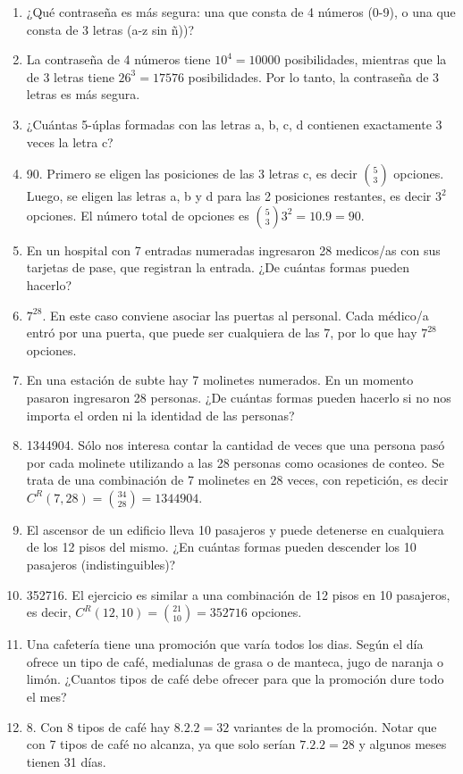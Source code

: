 \documentclass[a4paper]{article}
\newcommand{\answer}{\item[**]}
\begin{document}
\begin{enumerate}
\begin{enumerate} [label=(\alph*)]
		\item ¿Qué contraseña es más segura: una que consta de 4 números (0-9), o una que consta de 3 letras (a-z sin ñ))?
		\answer La contraseña de 4 números tiene $10^4=10000$ posibilidades, mientras que la de 3 letras tiene $26^3=17576$ posibilidades. Por lo tanto, la contraseña de 3 letras es más segura.

		\item ¿Cuántas 5-úplas formadas con las letras a, b, c, d contienen exactamente 3 veces	la letra c?
		\answer 90. Primero se eligen las posiciones de las 3 letras c, es decir $\binom{5}{3}$ opciones. Luego, se eligen las letras a, b y d para las 2 posiciones restantes, es decir $3^{2}$ opciones. El número total de opciones es $\binom{5}{3}3^{2}=10.9=90$.

		\item En un hospital con 7 entradas numeradas ingresaron 28 medicos/as con sus tarjetas de pase, que registran la entrada. ¿De cuántas formas pueden hacerlo? 
		\answer $7^{28}$. En este caso conviene asociar las puertas al personal. Cada médico/a entró por una puerta, que puede ser cualquiera de las 7, por lo que hay $7^{28}$ opciones.

		\item En una estación de subte hay 7 molinetes numerados. En un momento pasaron ingresaron 28 personas. ¿De cuántas formas pueden hacerlo si no nos importa el orden ni la identidad de las personas?
		\answer 1344904. Sólo nos interesa contar la cantidad de veces que una persona pasó por cada molinete utilizando a las 28 personas como ocasiones de conteo. Se trata de una combinación de 7 molinetes en 28 veces, con repetición, es decir $C^{R}(7,28)=\binom{34}{28}=1344904$.

		\item El ascensor de un edificio lleva 10 pasajeros y puede detenerse en cualquiera de los 12 pisos del mismo. ¿En cuántas formas pueden descender los 10 pasajeros (indistinguibles)?
		\answer 352716. El ejercicio es similar a una combinación de 12 pisos en 10 pasajeros, es decir, $C^R(12,10)=\binom{21}{10}=352716$ opciones.

		\item Una cafetería tiene una promoción que varía todos los dias. Según el día ofrece un tipo de café, medialunas de grasa o de manteca, jugo de naranja o limón. ¿Cuantos tipos de café debe ofrecer para que la promoción dure todo el mes?
		\answer 8. Con 8 tipos de café hay $8.2.2=32$ variantes de la promoción. Notar que con 7 tipos de café no alcanza, ya que solo serían $7.2.2=28$ y algunos meses tienen 31 días.


\end{enumerate}
\end{enumerate}
\end{document}
